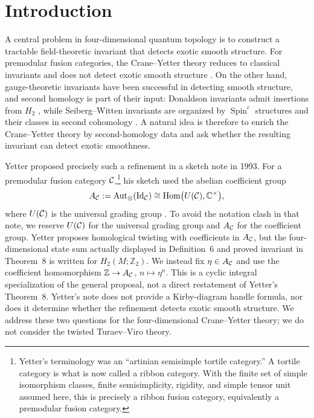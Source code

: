 \section{Introduction}

A central problem in four-dimensional quantum topology is to construct a
tractable field-theoretic invariant that detects exotic smooth structure.
For premodular fusion categories, the Crane--Yetter theory
reduces to classical invariants and does not detect exotic smooth structure
\cite{Reutter2023}.  On the other hand, gauge-theoretic invariants have been
successful in detecting smooth structure, and second homology is part of
their input: Donaldson invariants admit insertions from $H_2$
\cite{Donaldson1990}, while Seiberg--Witten invariants are organized by
$\operatorname{Spin}^c$ structures and their classes in second cohomology
\cite{Witten1994}.  A natural idea is therefore to enrich the Crane--Yetter
theory by second-homology data and ask whether the resulting invariant can
detect exotic smoothness.

Yetter proposed precisely such a refinement in a sketch note in 1993.  For a
premodular fusion category $\mathcal{C}$,\footnote{Yetter's terminology was an
``artinian semisimple tortile category.''  A tortile category is what is now
called a ribbon category.  With the finite set of simple isomorphism classes,
finite semisimplicity, rigidity, and simple tensor unit assumed here, this is
precisely a ribbon fusion category, equivalently a premodular fusion category.}
his sketch used the abelian coefficient group
\[
  A_{\mathcal{C}}:=\operatorname{Aut}_{\otimes}(\operatorname{Id}_{\mathcal{C}})
  \cong\operatorname{Hom}\bigl(U(\mathcal{C}),\mathbb C^\times\bigr),
\]
    where $U(\mathcal{C})$ is the universal grading group
    \cite[Definitions~1 and~3 and Proposition~4]{Yetter1993}.  To avoid the
notation clash in that note, we reserve $U(\mathcal{C})$ for the universal grading
    group and $A_{\mathcal{C}}$ for the coefficient group.  Yetter proposes homological
    twisting with coefficients in $A_{\mathcal{C}}$, but the four-dimensional state sum
    actually displayed in Definition~6 and proved invariant in Theorem~8 is
    written for $H_2(M;\mathbb Z_2)$.  We instead fix
    $\eta\in A_{\mathcal{C}}$ and use the coefficient homomorphism
    $\mathbb Z\to A_{\mathcal{C}}$, $n\mapsto\eta^n$.  This is a cyclic integral
specialization of the general proposal, not a direct restatement of Yetter's
Theorem~8.  Yetter's note does not provide a Kirby-diagram handle formula, nor
does it determine whether the refinement detects exotic smooth structure.  We
address these two questions for the four-dimensional Crane--Yetter theory; we
do not consider the twisted Turaev--Viro theory.

